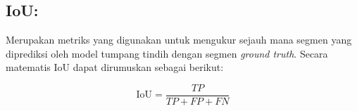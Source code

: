 




\subsection{IoU:}
\noindent Merupakan metriks yang digunakan untuk mengukur sejauh mana segmen yang diprediksi oleh model tumpang tindih dengan segmen \textit{ground truth}\cite{jiang_iu-net_2023}. Secara matematis IoU dapat dirumuskan sebagai berikut:

\begin{equation}
	\text{IoU} = \frac{TP}{TP + FP + FN}
\end{equation}

